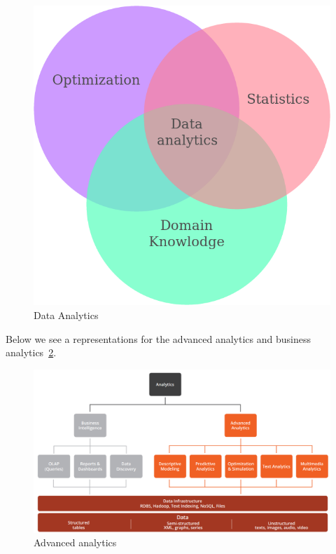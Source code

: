 \begin{figure}[H]
	\includegraphics[scale = 0.6]{figures/AnalyticsDomain.png}
	\centering
	\caption{Data Analytics}
	\label{fig:data-analytics}
\end{figure}
\FloatBarrier

Below we see a representations for the advanced analytics and business analytics~\ref{fig:rapidminer-aa}.

\begin{figure}[H]
	\includegraphics[scale=0.4]{figures/RapidMiner_AdvancedAnalytics_new.png}
	\caption{Advanced analytics}
	\label{fig:rapidminer-aa}
\end{figure}




